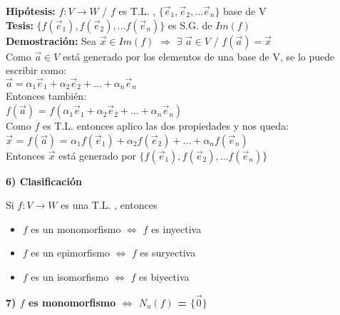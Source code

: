 \documentclass[11pt]{article}
\begin{document}
\vspace{2mm} \noindent
{\bfseries Hipótesis:} $f: V \rightarrow W$ / $f$ es T.L. , $\{\vec{e}_1, \vec{e}_2, \hdots  \vec{e}_n\}$ base de V \\
{\bfseries Tesis:} $\{f(\vec{e}_1), f(\vec{e}_2), \hdots  f(\vec{e}_n)\}$ es S.G. de $Im(f)$ \\
{\bfseries Demostración:} Sea $\vec{x} \in Im(f)$ $\Rightarrow$ $\exists$ $\vec{a} \in V$ / $f(\vec{a}) = \vec{x}$ \\
Como $\vec{a} \in V$ está generado por los elementos de una base de V, se lo puede escribir como: \\
$\vec{a} = \alpha_1\vec{e}_1 + \alpha_2\vec{e}_2 + \hdots + \alpha_n\vec{e}_n$
\\Entonces también: \\
$f(\vec{a})$ = $f(\alpha_1\vec{e}_1 + \alpha_2\vec{e}_2 + \hdots + \alpha_n\vec{e}_n)$\\
Como $f$ es T.L. entonces aplico las dos propiedades y nos queda: \\
$\vec{x}$ = $f(\vec{a})$ = $\alpha_1f(\vec{e}_1) + \alpha_2f(\vec{e}_2) + \hdots + \alpha_nf(\vec{e}_n)$ \\
Entonces $\vec{x}$ está generado por $\{f(\vec{e}_1), f(\vec{e}_2), \hdots  f(\vec{e}_n)\}$

\vspace{2mm} \noindent
{\Large \bfseries{6) Clasificación}}

\vspace{2mm} \noindent
Si $f:V \rightarrow W$ es una T.L. , entonces
\begin{itemize}
\item $f$ es un monomorfismo $\Leftrightarrow$ $f$ es inyectiva
\item $f$ es un epimorfismo $\Leftrightarrow$ $f$ es suryectiva
\item $f$ es un isomorfismo $\Leftrightarrow$ $f$ es biyectiva
\end{itemize}

\vspace{2mm} \noindent
{\Large \bfseries{7) $f$ es monomorfismo $\Leftrightarrow$ $N_u(f)$ = $\{\vec{0}\}$}}
\end{document}
